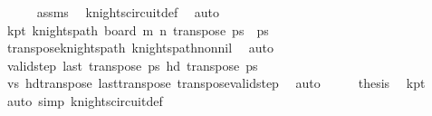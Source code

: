 \begin{isabellebody}
\ \ \ \ \isamarkupfalse%
\ assms\ \isamarkupfalse%
\ knights{\isacharunderscore}{\kern0pt}circuit{\isacharunderscore}{\kern0pt}def\ \isamarkupfalse%
\ auto\isanewline
\ \ \isamarkupfalse%
\ \isamarkupfalse%
\ kp{\isacharunderscore}{\kern0pt}t{\isacharcolon}{\kern0pt}\ {\isachardoublequoteopen}knights{\isacharunderscore}{\kern0pt}path\ {\isacharparenleft}{\kern0pt}board\ m\ n{\isacharparenright}{\kern0pt}\ {\isacharparenleft}{\kern0pt}transpose\ ps{\isacharparenright}{\kern0pt}{\isachardoublequoteclose}\ \ {\isachardoublequoteopen}ps\ {\isasymnoteq}\ {\isacharbrackleft}{\kern0pt}{\isacharbrackright}{\kern0pt}{\isachardoublequoteclose}\isanewline
\ \ \ \ \isamarkupfalse%
\ transpose{\isacharunderscore}{\kern0pt}knights{\isacharunderscore}{\kern0pt}path\ knights{\isacharunderscore}{\kern0pt}path{\isacharunderscore}{\kern0pt}non{\isacharunderscore}{\kern0pt}nil\ \isamarkupfalse%
\ auto\isanewline
\ \ \isamarkupfalse%
\ \isamarkupfalse%
\ {\isachardoublequoteopen}valid{\isacharunderscore}{\kern0pt}step\ {\isacharparenleft}{\kern0pt}last\ {\isacharparenleft}{\kern0pt}transpose\ ps{\isacharparenright}{\kern0pt}{\isacharparenright}{\kern0pt}\ {\isacharparenleft}{\kern0pt}hd\ {\isacharparenleft}{\kern0pt}transpose\ ps{\isacharparenright}{\kern0pt}{\isacharparenright}{\kern0pt}{\isachardoublequoteclose}\isanewline
\ \ \ \ \isamarkupfalse%
\ vs\ hd{\isacharunderscore}{\kern0pt}transpose\ last{\isacharunderscore}{\kern0pt}transpose\ transpose{\isacharunderscore}{\kern0pt}valid{\isacharunderscore}{\kern0pt}step\ \isamarkupfalse%
\ auto\isanewline
\ \ \isamarkupfalse%
\ \isamarkupfalse%
\ {\isacharquery}{\kern0pt}thesis\ \isamarkupfalse%
\ kp{\isacharunderscore}{\kern0pt}t\ \isamarkupfalse%
\ {\isacharparenleft}{\kern0pt}auto\ simp{\isacharcolon}{\kern0pt}\ knights{\isacharunderscore}{\kern0pt}circuit{\isacharunderscore}{\kern0pt}def{\isacharparenright}{\kern0pt}\isanewline
{}\isamarkupfalse%
%
\endisatagproof
{\isafoldproof}%
%
\isadelimproof
%
\endisadelimproof
%
\isadelimdocument
%
\endisadelimdocument
%
\isatagdocument
%
\isamarkuptrue%
%
\isamarkuptrue%
%
\endisatagdocument
{\isafolddocument}%
%
\isadelimdocument
%
\endisadelimdocument
{}\isamarkupfalse%

\end{isabellebody}
